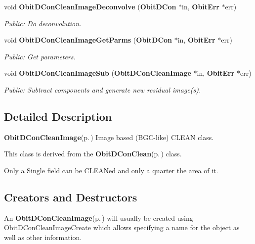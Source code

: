 \begin{CompactItemize}
void {\bf Obit\-DCon\-Clean\-Image\-Deconvolve} ({\bf Obit\-DCon} $\ast$in, {\bf Obit\-Err} $\ast$err)
\begin{CompactList}\small\item\em Public: Do deconvolution. \item\end{CompactList}\item 
void {\bf Obit\-DCon\-Clean\-Image\-Get\-Parms} ({\bf Obit\-DCon} $\ast$in, {\bf Obit\-Err} $\ast$err)
\begin{CompactList}\small\item\em Public: Get parameters. \item\end{CompactList}\item 
void {\bf Obit\-DCon\-Clean\-Image\-Sub} ({\bf Obit\-DCon\-Clean\-Image} $\ast$in, {\bf Obit\-Err} $\ast$err)
\begin{CompactList}\small\item\em Public: Subtract components and generate new residual image(s). \item\end{CompactList}\end{CompactItemize}


\subsection{Detailed Description}
{\bf Obit\-DCon\-Clean\-Image}{\rm (p.\,\pageref{structObitDConCleanImage})} Image based (BGC-like) CLEAN class. 

This class is derived from the {\bf Obit\-DCon\-Clean}{\rm (p.\,\pageref{structObitDConClean})} class.

Only a Single field can be CLEANed and only a quarter the area of it.\subsection{Creators and Destructors}\label{ObitDConCleanImage_8h_ObitDConCleanImageaccess}
An {\bf Obit\-DCon\-Clean\-Image}{\rm (p.\,\pageref{structObitDConCleanImage})} will usually be created using Obit\-DCon\-Clean\-Image\-Create which allows specifying a name for the object as well as other information.

